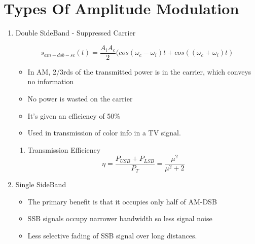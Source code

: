 \documentclass[11pt]{report}
\begin{document}
\section{Types Of Amplitude Modulation}
\label{sec:org8b78d20}
\begin{enumerate}
\item Double SideBand - Suppressed Carrier
\label{sec:org948e0a2}

$$s_{am-dsb-sc}(t) = \frac{A_iA_c}{2}(cos(\omega_c- \omega_i)t + cos((\omega_c + \omega_i)t)$$

\begin{itemize}
\item In AM, 2/3rds of the transmitted power is in the carrier, which conveys no information
\item No power is wasted on the carrier
\item It's given an efficiency of 50\%
\item Used in transmission of color info in a TV signal.
\end{itemize}
\begin{enumerate}
\item Transmission Efficiency
\label{sec:org381a7b0}
$$\eta = \frac{P_{USB} + P_{LSB}}{P_{T}} = \frac{\mu^2}{\mu^2 + 2}$$
\end{enumerate}
\item Single SideBand
\label{sec:orgbbede92}
\begin{itemize}
\item The primary benefit is that it occupies only half of AM-DSB
\item SSB signals occupy narrower bandwidth so less signal noise
\item Less selective fading of SSB signal over long distances.
\end{itemize}


\end{enumerate}
\end{document}
